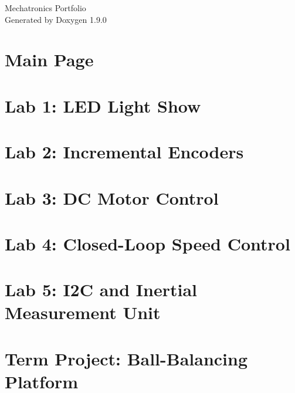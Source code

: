 \let\mypdfximage\pdfximage\def\pdfximage{\immediate\mypdfximage}\documentclass[twoside]{book}
\newcommand{\+}{\discretionary{\mbox{\scriptsize$\hookleftarrow$}}{}{}}
\newcommand{\clearemptydoublepage}{%
  \newpage{\pagestyle{empty}\cleardoublepage}%
}
\begin{document}
\raggedbottom

\hypersetup{pageanchor=false,
             bookmarksnumbered=true,
             pdfencoding=unicode
            }
\begin{titlepage}
\vspace*{7cm}
\begin{center}%
{\Large Mechatronics Portfolio }\\
\vspace*{1cm}
{\large Generated by Doxygen 1.9.0}\\
\end{center}
\end{titlepage}
\clearemptydoublepage
{}
\tableofcontents
\clearemptydoublepage
{}
\hypersetup{pageanchor=true}

\chapter{Main Page}
\label{index}\hypertarget{index}{}
\chapter{Lab 1\+: LED Light Show}
\label{lab1page_8py}

\chapter{Lab 2\+: Incremental Encoders}
\label{lab2page_8py}

\chapter{Lab 3\+: DC Motor Control}
\label{lab3page_8py}

\chapter{Lab 4\+: Closed-\/\+Loop Speed Control}
\label{lab4page_8py}

\chapter{Lab 5\+: I2C and Inertial Measurement Unit}
\label{lab5page_8py}

\chapter{Term Project\+: Ball-\/\+Balancing Platform}
\label{labtermpage_8py}

\end{document}
